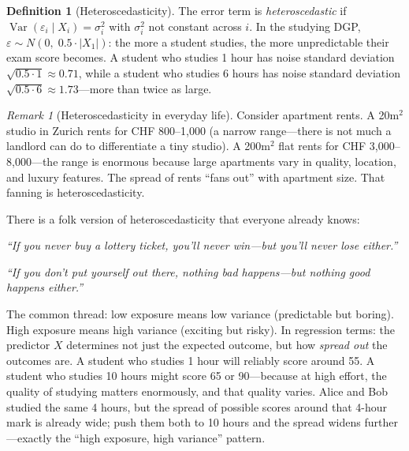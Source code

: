 \documentclass[11pt,a4paper]{article}
\theoremstyle{definition}
\newtheorem{definition}{Definition}[section]
\theoremstyle{plain}
\theoremstyle{remark}
\newtheorem{remark}{Remark}[section]
\newcommand{\Var}{\operatorname{Var}}
\begin{document}
\begin{definition}[Heteroscedasticity]
The error term is \emph{heteroscedastic} if $\Var(\varepsilon_i \mid X_i) = \sigma_i^2$ with $\sigma_i^2$ not constant across $i$.
In the studying DGP, $\varepsilon \sim N(0,\; 0.5 \cdot |X_1|)$: the more a student studies, the more unpredictable their exam score becomes. A student who studies 1 hour has noise standard deviation $\sqrt{0.5 \cdot 1} \approx 0.71$, while a student who studies 6 hours has noise standard deviation $\sqrt{0.5 \cdot 6} \approx 1.73$---more than twice as large.
\end{definition}

\begin{remark}[Heteroscedasticity in everyday life]
Consider apartment rents. A 20m$^2$ studio in Zurich rents for CHF 800--1{,}000 (a narrow range---there is not much a landlord can do to differentiate a tiny studio). A 200m$^2$ flat rents for CHF 3{,}000--8{,}000---the range is enormous because large apartments vary in quality, location, and luxury features. The spread of rents ``fans out'' with apartment size. That fanning is heteroscedasticity.
\end{remark}

\begin{keyinsight}[title={Heteroscedasticity in Everyday Wisdom}]
There is a folk version of heteroscedasticity that everyone already knows:

\emph{``If you never buy a lottery ticket, you'll never win---but you'll never lose either.''}

\emph{``If you don't put yourself out there, nothing bad happens---but nothing good happens either.''}

The common thread: low exposure means low variance (predictable but boring). High exposure means high variance (exciting but risky). In regression terms: the predictor $X$ determines not just the expected outcome, but how \emph{spread out} the outcomes are. A student who studies 1 hour will reliably score around 55. A student who studies 10 hours might score 65 or 90---because at high effort, the quality of studying matters enormously, and that quality varies. Alice and Bob studied the same 4 hours, but the spread of possible scores around that 4-hour mark is already wide; push them both to 10 hours and the spread widens further---exactly the ``high exposure, high variance'' pattern.
\end{keyinsight}
\end{document}

